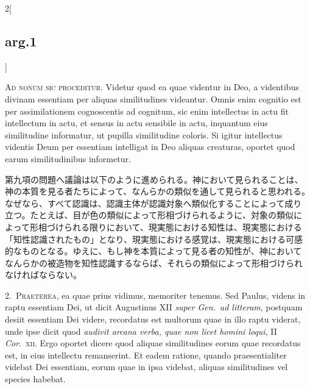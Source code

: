 \documentclass[paper=a4paper,fontsize=10pt,jafontsize=9pt,titlepage]{jlreq}
\begin{document}
{}
\setcounter{section}{9}
\setcounter{subsection}{0}

\begin{paracol}{2}[\subsection{arg.1}]

{\scshape Ad nonum sic proceditur}. Videtur quod ea quae videntur in Deo, a
videntibus divinam essentiam per aliquas similitudines
videantur. Omnis enim cognitio est per assimilationem cognoscentis ad
cognitum, sic enim intellectus in actu fit intellectum in actu, et
sensus in actu sensibile in actu, inquantum eius similitudine
informatur, ut pupilla similitudine coloris. Si igitur intellectus
videntis Deum per essentiam intelligat in Deo aliquas creaturas,
oportet quod earum similitudinibus informetur.

\switchcolumn

第九項の問題へ議論は以下のように進められる。神において見られることは、
神の本質を見る者たちによって、なんらかの類似を通して見られると思われる。
なぜなら、すべて認識は、認識主体が認識対象へ類似化することによって成り
立つ。たとえば、目が色の類似によって形相づけられるように、対象の類似に
よって形相づけられる限りにおいて、現実態における知性は、現実態における
「知性認識されたもの」となり、現実態における感覚は、現実態における可感
的なものとなる。ゆえに、もし神を本質によって見る者の知性が、神において
なんらかの被造物を知性認識するならば、それらの類似によって形相づけられ
なければならない。


2.~{\scshape Praeterea}, ea quae prius vidimus, memoriter tenemus. Sed
 Paulus, videns in raptu essentiam Dei, ut dicit Augustinus XII {\itshape
 super Gen.\ ad litteram}, postquam desiit essentiam Dei videre,
 recordatus est multorum quae in illo raptu viderat, unde ipse dicit
 quod {\itshape audivit arcana verba, quae non licet homini loqui}, II {\itshape
 Cor}.\ {\scshape xii}. Ergo oportet dicere quod aliquae similitudines
 eorum quae recordatus est, in eius intellectu remanserint. Et eadem
 ratione, quando praesentialiter videbat Dei essentiam, eorum quae in
 ipsa videbat, aliquas similitudines vel species habebat.


\end{paracol}
\end{document}
